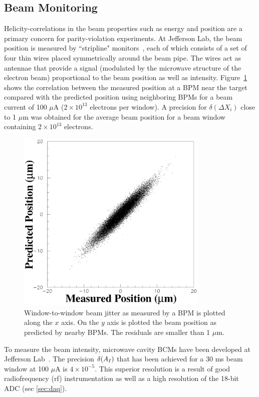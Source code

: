 \subsection{Beam Monitoring}
\label{sec:beam_mon}

Helicity-correlations in the beam properties such as energy and position are
a primary concern for parity-violation experiments.  
At Jefferson Lab, the beam position is measured by ``stripline"
monitors~\cite{stripline}, each of which consists of a set of four thin wires
placed symmetrically around the beam pipe. The wires act as antennae
that provide a signal (modulated by the microwave structure of the
electron beam) proportional to the beam position as well as
intensity. Figure~\ref{fig5:jlabcorr} shows the correlation between
the measured position at a BPM near the target compared with the
predicted position using neighboring BPMs for a beam current of
100 $\mu$A ($2\times 10^{13}$ electrons per window). A precision
for $\delta(\Delta X_i)$ close to 1 $\mu$m was obtained for the
average beam position for a beam window containing $2\times
10^{13}$ electrons.

\begin{figure}[tb]
\begin{center}
\includegraphics[width=3.6in]{RM/fig5_ycorrbw.eps}
\caption{Window-to-window beam jitter as measured
by a BPM is 
plotted along the $x$ axis. On the $y$ axis is plotted the beam
position as predicted by nearby BPMs. The residuals are smaller
than 1 $\mu$m.}
\label{fig5:jlabcorr}
\end{center}
\end{figure}

To measure the beam intensity, microwave cavity BCMs have been
developed at Jefferson Lab~\cite{A-NIM}. 
The precision $\delta(A_I)$ that has
been achieved for a 30 ms beam window at 100 $\mu$A is $4\times
10^{-5}$. This superior resolution is a 
result of good radiofrequency (rf)
instrumentation as well as a high resolution of the 18-bit ADC
(sec \ref{sec:daq}).

